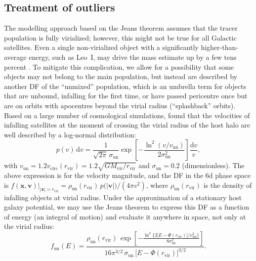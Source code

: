 \documentclass[usenatbib,fleqn]{mnras}
\begin{document}
\subsection{Treatment of outliers}  \label{sec:outliers}

The modelling approach based on the Jeans theorem assumes that the tracer population is fully virialized; however, this might not be true for all Galactic satellites. Even a single non-virialized object with a significantly higher-than-average energy, such as Leo~I, may drive the mass estimate up by a few tens percent \citep[e.g.,][]{Watkins2010}. To mitigate this complication, we allow for a possibility that some objects may not belong to the main population, but instead are described by another DF of the ``unmixed'' population, which is an umbrella term for objects that are unbound, infalling for the first time, or have passed pericentre once but are on orbits with apocentres beyond the virial radius (``splashback'' orbits). Based on a large number of cosmological simulations, \citet{Li2020b} found that the velocities of infalling satellites at the moment of crossing the virial radius of the host halo are well described by a log-normal distribution:
\begin{equation}  \label{eq:velocity_distribution_unmixed}
p(v)\,\text{d}v = \frac{1}{\sqrt{2\pi}\,\sigma_\text{un}} \exp\left[-\frac{\ln^2(v/v_\text{un})}{2\sigma_\text{un}^2}\right] \frac{\text{d}v}{v},
\end{equation}
with $v_\text{un} = 1.2 v_\text{circ}(r_\text{vir}) = 1.2\sqrt{G M_\text{vir}/r_\text{vir}}$ and $\sigma_\text{un} = 0.2$ (dimensionless). The above expression is for the velocity magnitude, and the DF in the 6d phase space is $\displaystyle f(\boldsymbol{x},\boldsymbol{v})\big|_{|\boldsymbol x|=r_\text{vir}} = \rho_\text{un}(r_\text{vir})\, p\big(|\boldsymbol v|\big) \big/ (4\pi v^2)$, where $\rho_\text{un}(r_\text{vir})$ is the density of infalling objects at virial radius. Under the approximation of a stationary host galaxy potential, we may use the Jeans theorem to express this DF as a function of energy (an integral of motion) and evaluate it anywhere in space, not only at the virial radius:
\begin{equation}  \label{eq:df_unmixed}
f_\text{un}(E) = \frac{\displaystyle\rho_\text{un}(r_\text{vir})\, \exp\left[
-\frac{\ln^2\Big\{2\big[E-\Phi(r_\text{vir})\big]/v_\text{un}^2\Big\}}
{8\sigma_\text{un}^2}\right]}
{16\pi^{3/2}\,\sigma_\text{un}\,\big[E-\Phi(r_\text{vir})\big]^{3/2}} .
\end{equation}
\end{document}
